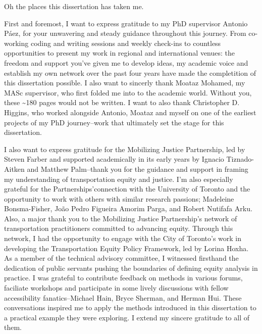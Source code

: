 \documentclass[
11pt, %
oneside, %
english, %
singlespacing, %
]{macthesis} %
\begin{document}
  \begin{acknowledgements}
  \addchaptertocentry{\acknowledgementname} %
    Oh the places this dissertation has taken me.

    First and foremost, I want to express gratitude to my PhD supervisor Antonio Páez, for your unwavering and steady guidance throughout this journey. From co-working coding and writing sessions and weekly check-ins to countless opportunities to present my work in regional and international venues: the freedom and support you've given me to develop ideas, my academic voice and establish my own network over the past four years have made the completition of this dissertation possible. I also want to sincerly thank Moataz Mohamed, my MASc supervisor, who first folded me into to the academic world. Without you, these \textasciitilde180 pages would not be written. I want to also thank Christopher D. Higgins, who worked alongside Antonio, Moataz and myself on one of the earliest projects of my PhD journey--work that ultimately set the stage for this dissertation.

    I also want to express gratitude for the Mobilizing Justice Partnership, led by Steven Farber and supported academically in its early years by Ignacio Tiznado-Aitken and Matthew Palm--thank you for the guidance and support in framing my understanding of transportation equity and justice. I'm also especially grateful for the Partnerships'connection with the University of Toronto and the opportunity to work with others with similar research passions; Madeleine Bonsma-Fisher, João Pedro Figueira Amorim Parga, and Robert Nutifafa Arku. Also, a major thank you to the Mobilizing Justice Partnership's network of transportation practitioners committed to advancing equity. Through this network, I had the opportunity to engage with the City of Toronto's work in developing the Transportation Equity Policy Framework, led by Lorina Hoxha. As a member of the technical advisory committee, I witnessed firsthand the dedication of public servants pushing the boundaries of defining equity analysis in practice. I was grateful to contribute feedback on methods in various forums, faciliate workshops and participate in some lively discussions with fellow accessibility fanatics--Michael Hain, Bryce Sherman, and Herman Hui. These conversations inspired me to apply the methods introduced in this dissertation to a practical example they were exploring. I extend my sincere gratitude to all of them.


\end{acknowledgements}
\end{document}
